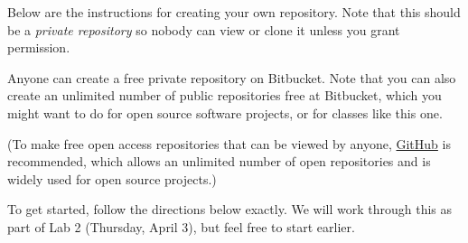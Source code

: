 \documentclass[letterpaper,10pt,english]{sphinxmanual}
\begin{document}
Below are the instructions for creating your own repository.  Note that
this should be a \emph{private repository} so nobody can view or clone it unless
you grant permission.

Anyone can create a free private repository on Bitbucket.
Note that you can also create an unlimited number of public repositories
free at Bitbucket, which you might want to do for open source software
projects, or for classes like this one.

(To make free open access repositories that can be viewed by anyone,
\href{https://github.com/}{GitHub}
is recommended, which allows an unlimited number of
open repositories and is widely used for open source projects.)

To get started, follow the directions below exactly.
We will work through this as part of Lab 2 (Thursday, April 3), but feel
free to start earlier.
\end{document}
